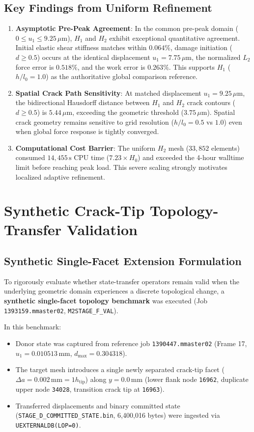 \subsection{Key Findings from Uniform Refinement}
\begin{enumerate}
    \item \textbf{Asymptotic Pre-Peak Agreement}: In the common pre-peak domain ($0 \le u_1 \le 9.25\,\mu\text{m}$), $H_1$ and $H_2$ exhibit exceptional quantitative agreement. Initial elastic shear stiffness matches within $0.064\%$, damage initiation ($d \ge 0.5$) occurs at the identical displacement $u_1 = 7.75\,\mu\text{m}$, the normalized $L_2$ force error is $0.518\%$, and the work error is $0.263\%$. This supports $H_1$ ($h/l_0 = 1.0$) as the authoritative global comparison reference.
    \item \textbf{Spatial Crack Path Sensitivity}: At matched displacement $u_1 = 9.25\,\mu\text{m}$, the bidirectional Hausdorff distance between $H_1$ and $H_2$ crack contours ($d \ge 0.5$) is $5.44\,\mu\text{m}$, exceeding the geometric threshold ($3.75\,\mu\text{m}$). Spatial crack geometry remains sensitive to grid resolution ($h/l_0 = 0.5$ vs $1.0$) even when global force response is tightly converged.
    \item \textbf{Computational Cost Barrier}: The uniform $H_2$ mesh ($33,852$ elements) consumed $14,455\,\text{s}$ CPU time ($7.23\times H_0$) and exceeded the 4-hour walltime limit before reaching peak load. This severe scaling strongly motivates localized adaptive refinement.
\end{enumerate}

\section{Synthetic Crack-Tip Topology-Transfer Validation}
\label{sec:topo_synthetic_validation}

\subsection{Synthetic Single-Facet Extension Formulation}
To rigorously evaluate whether state-transfer operators remain valid when the underlying geometric domain experiences a discrete topological change, a \textbf{synthetic single-facet topology benchmark} was executed (Job \texttt{1393159.mmaster02}, \texttt{M2STAGE\_F\_VAL}).

In this benchmark:
\begin{itemize}
    \item Donor state was captured from reference job \texttt{1390447.mmaster02} (Frame 17, $u_1 = 0.010513\,\text{mm}$, $d_{\max} = 0.304318$).
    \item The target mesh introduces a single newly separated crack-tip facet ($\Delta a = 0.002\,\text{mm} = 1 h_{\mathrm{tip}}$) along $y = 0.0\,\text{mm}$ (lower flank node \texttt{16962}, duplicate upper node \texttt{34028}, transition crack tip at \texttt{16963}).
    \item Transferred displacements and binary committed state (\texttt{STAGE\_D\_COMMITTED\_STATE.bin}, 6,400,016 bytes) were ingested via \texttt{UEXTERNALDB(LOP=0)}.
\end{itemize}

